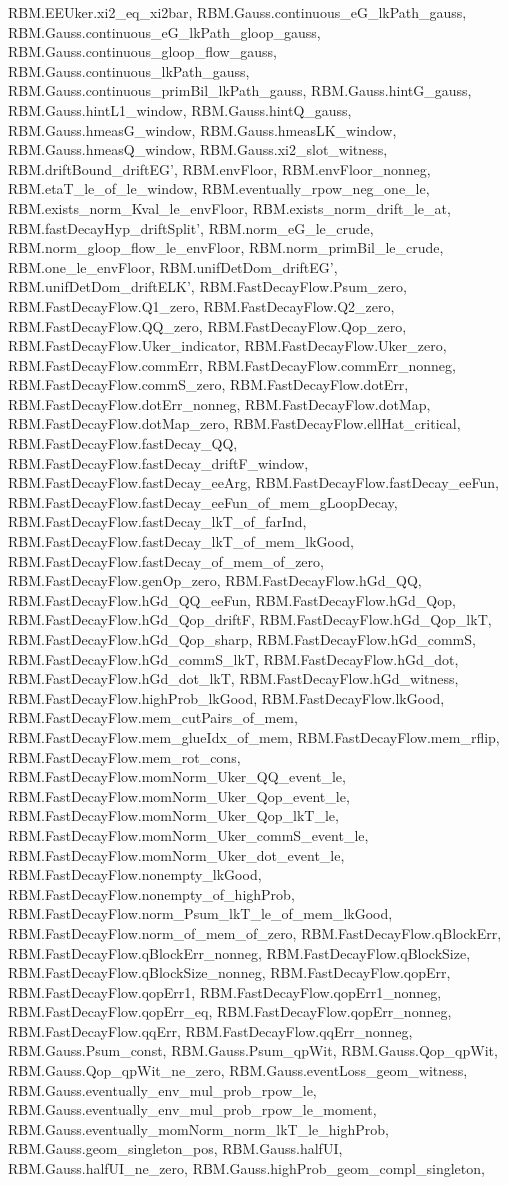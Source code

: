 \begin{theorem}
RBM.EEUker.xi2_eq_xi2bar, RBM.Gauss.continuous_eG_lkPath_gauss, RBM.Gauss.continuous_eG_lkPath_gloop_gauss, RBM.Gauss.continuous_gloop_flow_gauss, RBM.Gauss.continuous_lkPath_gauss, RBM.Gauss.continuous_primBil_lkPath_gauss, RBM.Gauss.hintG_gauss, RBM.Gauss.hintL1_window, RBM.Gauss.hintQ_gauss, RBM.Gauss.hmeasG_window, RBM.Gauss.hmeasLK_window, RBM.Gauss.hmeasQ_window, RBM.Gauss.xi2_slot_witness, RBM.driftBound_driftEG', RBM.envFloor, RBM.envFloor_nonneg, RBM.etaT_le_of_le_window, RBM.eventually_rpow_neg_one_le, RBM.exists_norm_Kval_le_envFloor, RBM.exists_norm_drift_le_at, RBM.fastDecayHyp_driftSplit', RBM.norm_eG_le_crude, RBM.norm_gloop_flow_le_envFloor, RBM.norm_primBil_le_crude, RBM.one_le_envFloor, RBM.unifDetDom_driftEG', RBM.unifDetDom_driftELK', RBM.FastDecayFlow.Psum_zero, RBM.FastDecayFlow.Q1_zero, RBM.FastDecayFlow.Q2_zero, RBM.FastDecayFlow.QQ_zero, RBM.FastDecayFlow.Qop_zero, RBM.FastDecayFlow.Uker_indicator, RBM.FastDecayFlow.Uker_zero, RBM.FastDecayFlow.commErr, RBM.FastDecayFlow.commErr_nonneg, RBM.FastDecayFlow.commS_zero, RBM.FastDecayFlow.dotErr, RBM.FastDecayFlow.dotErr_nonneg, RBM.FastDecayFlow.dotMap, RBM.FastDecayFlow.dotMap_zero, RBM.FastDecayFlow.ellHat_critical, RBM.FastDecayFlow.fastDecay_QQ, RBM.FastDecayFlow.fastDecay_driftF_window, RBM.FastDecayFlow.fastDecay_eeArg, RBM.FastDecayFlow.fastDecay_eeFun, RBM.FastDecayFlow.fastDecay_eeFun_of_mem_gLoopDecay, RBM.FastDecayFlow.fastDecay_lkT_of_farInd, RBM.FastDecayFlow.fastDecay_lkT_of_mem_lkGood, RBM.FastDecayFlow.fastDecay_of_mem_of_zero, RBM.FastDecayFlow.genOp_zero, RBM.FastDecayFlow.hGd_QQ, RBM.FastDecayFlow.hGd_QQ_eeFun, RBM.FastDecayFlow.hGd_Qop, RBM.FastDecayFlow.hGd_Qop_driftF, RBM.FastDecayFlow.hGd_Qop_lkT, RBM.FastDecayFlow.hGd_Qop_sharp, RBM.FastDecayFlow.hGd_commS, RBM.FastDecayFlow.hGd_commS_lkT, RBM.FastDecayFlow.hGd_dot, RBM.FastDecayFlow.hGd_dot_lkT, RBM.FastDecayFlow.hGd_witness, RBM.FastDecayFlow.highProb_lkGood, RBM.FastDecayFlow.lkGood, RBM.FastDecayFlow.mem_cutPairs_of_mem, RBM.FastDecayFlow.mem_glueIdx_of_mem, RBM.FastDecayFlow.mem_rflip, RBM.FastDecayFlow.mem_rot_cons, RBM.FastDecayFlow.momNorm_Uker_QQ_event_le, RBM.FastDecayFlow.momNorm_Uker_Qop_event_le, RBM.FastDecayFlow.momNorm_Uker_Qop_lkT_le, RBM.FastDecayFlow.momNorm_Uker_commS_event_le, RBM.FastDecayFlow.momNorm_Uker_dot_event_le, RBM.FastDecayFlow.nonempty_lkGood, RBM.FastDecayFlow.nonempty_of_highProb, RBM.FastDecayFlow.norm_Psum_lkT_le_of_mem_lkGood, RBM.FastDecayFlow.norm_of_mem_of_zero, RBM.FastDecayFlow.qBlockErr, RBM.FastDecayFlow.qBlockErr_nonneg, RBM.FastDecayFlow.qBlockSize, RBM.FastDecayFlow.qBlockSize_nonneg, RBM.FastDecayFlow.qopErr, RBM.FastDecayFlow.qopErr1, RBM.FastDecayFlow.qopErr1_nonneg, RBM.FastDecayFlow.qopErr_eq, RBM.FastDecayFlow.qopErr_nonneg, RBM.FastDecayFlow.qqErr, RBM.FastDecayFlow.qqErr_nonneg, RBM.Gauss.Psum_const, RBM.Gauss.Psum_qpWit, RBM.Gauss.Qop_qpWit, RBM.Gauss.Qop_qpWit_ne_zero, RBM.Gauss.eventLoss_geom_witness, RBM.Gauss.eventually_env_mul_prob_rpow_le, RBM.Gauss.eventually_env_mul_prob_rpow_le_moment, RBM.Gauss.eventually_momNorm_norm_lkT_le_highProb, RBM.Gauss.geom_singleton_pos, RBM.Gauss.halfUI, RBM.Gauss.halfUI_ne_zero, RBM.Gauss.highProb_geom_compl_singleton, 
\end{theorem}
